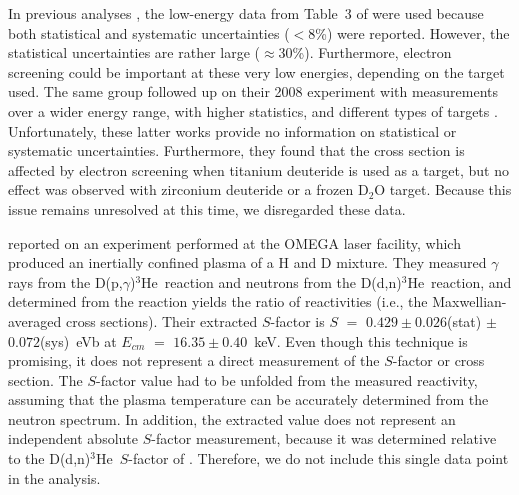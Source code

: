 \documentclass[twocolumn]{aastex63}
\newcommand{\ddn}{{D(d,n)$^3$He}}
\newcommand{\dpg}{{D(p,$\gamma$)$^3$He}}
\begin{document}
In previous analyses \citep{Coc15,iliadis16}, the low-energy data from Table~3 of \citet{Bys08} were used because both statistical and systematic uncertainties ($<$8\%) were reported. However, the statistical uncertainties are rather large ($\approx$30\%). Furthermore, electron screening could be important at these very low energies, depending on the target used. The same group followed up on their 2008 experiment with measurements over a wider energy range, with higher statistics, and different types of targets \citep{Bys14a,Bys14b,Bys15}. Unfortunately, these latter works provide no information on statistical or systematic uncertainties. Furthermore, they found that the cross section is affected by electron screening when titanium deuteride is used as a target, but no effect was observed with zirconium deuteride or a frozen D$_2$O target. Because this issue remains unresolved at this time, we disregarded these data.

\citet{Zylstra} reported on an experiment performed at the OMEGA laser facility, which produced an inertially confined plasma of a H and D mixture. They measured $\gamma$ rays from the \dpg\ reaction and neutrons from the \ddn\ reaction, and determined from the reaction yields the ratio of reactivities (i.e., the Maxwellian-averaged cross sections). Their extracted $S$-factor is $S$ $=$ $0.429\pm0.026$(stat) $\pm$ $0.072$(sys)~eVb at $E_{cm}$ $=$ $16.35\pm0.40$~keV. Even though this technique is promising, it does not represent a direct measurement of the $S$-factor or cross section. The $S$-factor value had to be unfolded from the measured reactivity, assuming that the plasma temperature can be accurately determined from the neutron spectrum. In addition, the extracted value does not represent an independent absolute $S$-factor measurement, because it was determined relative to the \ddn\ $S$-factor of \citet{Bos92}. Therefore, we do not include this single data point in the analysis.

\end{document}
